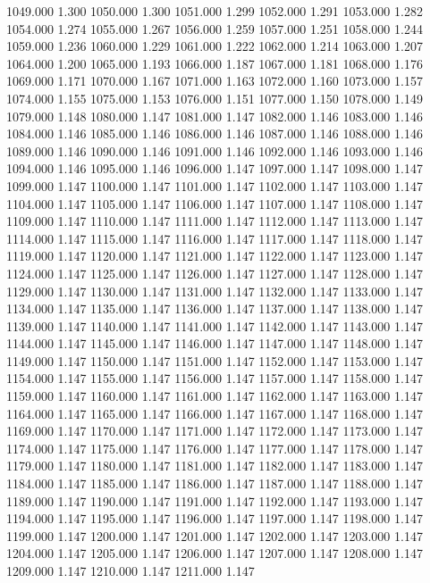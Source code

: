 1049.000 1.300 
1050.000 1.300 
1051.000 1.299 
1052.000 1.291 
1053.000 1.282 
1054.000 1.274 
1055.000 1.267 
1056.000 1.259 
1057.000 1.251 
1058.000 1.244 
1059.000 1.236 
1060.000 1.229 
1061.000 1.222 
1062.000 1.214 
1063.000 1.207 
1064.000 1.200 
1065.000 1.193 
1066.000 1.187 
1067.000 1.181 
1068.000 1.176 
1069.000 1.171 
1070.000 1.167 
1071.000 1.163 
1072.000 1.160 
1073.000 1.157 
1074.000 1.155 
1075.000 1.153 
1076.000 1.151 
1077.000 1.150 
1078.000 1.149 
1079.000 1.148 
1080.000 1.147 
1081.000 1.147 
1082.000 1.146 
1083.000 1.146 
1084.000 1.146 
1085.000 1.146 
1086.000 1.146 
1087.000 1.146 
1088.000 1.146 
1089.000 1.146 
1090.000 1.146 
1091.000 1.146 
1092.000 1.146 
1093.000 1.146 
1094.000 1.146 
1095.000 1.146 
1096.000 1.147 
1097.000 1.147 
1098.000 1.147 
1099.000 1.147 
1100.000 1.147 
1101.000 1.147 
1102.000 1.147 
1103.000 1.147 
1104.000 1.147 
1105.000 1.147 
1106.000 1.147 
1107.000 1.147 
1108.000 1.147 
1109.000 1.147 
1110.000 1.147 
1111.000 1.147 
1112.000 1.147 
1113.000 1.147 
1114.000 1.147 
1115.000 1.147 
1116.000 1.147 
1117.000 1.147 
1118.000 1.147 
1119.000 1.147 
1120.000 1.147 
1121.000 1.147 
1122.000 1.147 
1123.000 1.147 
1124.000 1.147 
1125.000 1.147 
1126.000 1.147 
1127.000 1.147 
1128.000 1.147 
1129.000 1.147 
1130.000 1.147 
1131.000 1.147 
1132.000 1.147 
1133.000 1.147 
1134.000 1.147 
1135.000 1.147 
1136.000 1.147 
1137.000 1.147 
1138.000 1.147 
1139.000 1.147 
1140.000 1.147 
1141.000 1.147 
1142.000 1.147 
1143.000 1.147 
1144.000 1.147 
1145.000 1.147 
1146.000 1.147 
1147.000 1.147 
1148.000 1.147 
1149.000 1.147 
1150.000 1.147 
1151.000 1.147 
1152.000 1.147 
1153.000 1.147 
1154.000 1.147 
1155.000 1.147 
1156.000 1.147 
1157.000 1.147 
1158.000 1.147 
1159.000 1.147 
1160.000 1.147 
1161.000 1.147 
1162.000 1.147 
1163.000 1.147 
1164.000 1.147 
1165.000 1.147 
1166.000 1.147 
1167.000 1.147 
1168.000 1.147 
1169.000 1.147 
1170.000 1.147 
1171.000 1.147 
1172.000 1.147 
1173.000 1.147 
1174.000 1.147 
1175.000 1.147 
1176.000 1.147 
1177.000 1.147 
1178.000 1.147 
1179.000 1.147 
1180.000 1.147 
1181.000 1.147 
1182.000 1.147 
1183.000 1.147 
1184.000 1.147 
1185.000 1.147 
1186.000 1.147 
1187.000 1.147 
1188.000 1.147 
1189.000 1.147 
1190.000 1.147 
1191.000 1.147 
1192.000 1.147 
1193.000 1.147 
1194.000 1.147 
1195.000 1.147 
1196.000 1.147 
1197.000 1.147 
1198.000 1.147 
1199.000 1.147 
1200.000 1.147 
1201.000 1.147 
1202.000 1.147 
1203.000 1.147 
1204.000 1.147 
1205.000 1.147 
1206.000 1.147 
1207.000 1.147 
1208.000 1.147 
1209.000 1.147 
1210.000 1.147 
1211.000 1.147 
